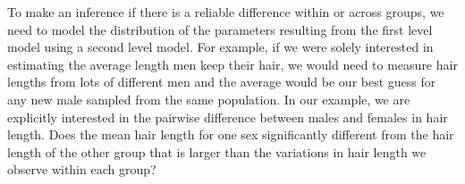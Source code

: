\documentclass[letterpaper,10pt,english]{sphinxmanual}
\begin{document}
\begin{sphinxVerbatim}[commandchars=\\\{\}]
   
   
   
\PYG{p}{[}  \PYG{p}{]} \PYG{p}{[}  \PYG{p}{]}
\end{sphinxVerbatim}

\noindent{}

To make an inference if there is a reliable difference within or across groups, we need to model the distribution of the parameters resulting from the first level model using a second level model. For example, if we were solely interested in estimating the average length men keep their hair, we would need to measure hair lengths from lots of different men and the average would be our best guess for any new male sampled from the same population. In our example, we are explicitly interested in the pairwise difference between males and females in hair length. Does the mean hair length for one sex significantly different from the hair length of the other group that is larger than the variations in hair length we observe within each group?
\end{document}
